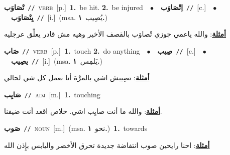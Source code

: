 \documentclass[10pt,a4paper,twoside]{article} %
\begin{document}
\begin{multicols}{2}
{\setlength\topsep{0pt}\textbf{\foreignlanguage{arabic}{تْصَاوَب}}\ {\color{gray}\texttt{//}\color{black}}\ \textsc{verb}\ [p.]\ \textbf{1.}~be hit.  \textbf{2.}~be injured\ \ $\bullet$\ \ \setlength\topsep{0pt}\textbf{\foreignlanguage{arabic}{اِتْصَاوَب}}\ {\color{gray}\texttt{//}\color{black}}\ [c.]\ \ $\bullet$\ \ \setlength\topsep{0pt}\textbf{\foreignlanguage{arabic}{يِتْصَاوَب}}\ {\color{gray}\texttt{//}\color{black}}\ [i.]\ \color{gray}(msa. \foreignlanguage{arabic}{يُصِيب}~\foreignlanguage{arabic}{\textbf{١.}})\color{black}\  \begin{flushright}\color{gray}\foreignlanguage{arabic}{\textbf{\underline{\foreignlanguage{arabic}{أمثلة}}}: والله ياعمي جوزي تْصاوَب بالقصف الأخير وهيه مش قادر يعلِّق عرجليه}\end{flushright}\color{black}} \vspace{2mm}

{\setlength\topsep{0pt}\textbf{\foreignlanguage{arabic}{صَاب}}\ {\color{gray}\texttt{//}\color{black}}\ \textsc{verb}\ [p.]\ \textbf{1.}~touch  \textbf{2.}~do anything\ \ $\bullet$\ \ \setlength\topsep{0pt}\textbf{\foreignlanguage{arabic}{صِيب}}\ {\color{gray}\texttt{//}\color{black}}\ [c.]\ \ $\bullet$\ \ \setlength\topsep{0pt}\textbf{\foreignlanguage{arabic}{يصِيب}}\ {\color{gray}\texttt{//}\color{black}}\ [i.]\ \color{gray}(msa. \foreignlanguage{arabic}{يَلمِس}~\foreignlanguage{arabic}{\textbf{١.}})\color{black}\  \begin{flushright}\color{gray}\foreignlanguage{arabic}{\textbf{\underline{\foreignlanguage{arabic}{أمثلة}}}: تصِيبش اشي بالمرَّة أنا بعمل كل شي لحالي}\end{flushright}\color{black}} \vspace{2mm}

{\setlength\topsep{0pt}\textbf{\foreignlanguage{arabic}{صَايِب}}\ {\color{gray}\texttt{//}\color{black}}\ \textsc{adj}\ [m.]\ \textbf{1.}~touching\  \begin{flushright}\color{gray}\foreignlanguage{arabic}{\textbf{\underline{\foreignlanguage{arabic}{أمثلة}}}: والله ما أنت صايِب اشي. خلاص اقعد أنت ضيفنا.}\end{flushright}\color{black}} \vspace{2mm}

{\setlength\topsep{0pt}\textbf{\foreignlanguage{arabic}{صَوب}}\ {\color{gray}\texttt{//}\color{black}}\ \textsc{noun}\ [m.]\ \color{gray}(msa. \foreignlanguage{arabic}{نحو}~\foreignlanguage{arabic}{\textbf{١.}})\color{black}\ \textbf{1.}~towards\  \begin{flushright}\color{gray}\foreignlanguage{arabic}{\textbf{\underline{\foreignlanguage{arabic}{أمثلة}}}: احنا رايحين صوب انتفاضة جديدة تحرق الأخضر واليابس بإِذن الله}\end{flushright}\color{black}} \vspace{2mm}


\end{multicols}
\end{document}

